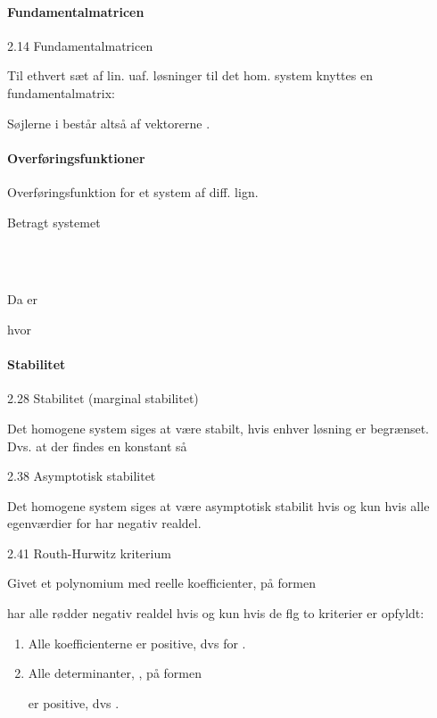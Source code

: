 \documentclass[
]{article}
\providecommand{\tightlist}{%
  \setlength{\itemsep}{0pt}\setlength{\parskip}{0pt}}
\begin{document}
\paragraph{Fundamentalmatricen}\label{fundamentalmatricen}

2.14 Fundamentalmatricen

Til ethvert sæt af {} lin. uaf. løsninger {} til det hom. system {}
knyttes en {} fundamentalmatrix:

Søjlerne i {} består altså af vektorerne {}.

\paragraph{Overføringsfunktioner}\label{overfuxf8ringsfunktioner}

Overføringsfunktion for et system af diff. lign.

Betragt systemet\\
{}\strut \\
{}\strut \\
Da er

hvor

\paragraph{Stabilitet}\label{stabilitet}

2.28 {} Stabilitet (marginal stabilitet)

Det homogene system {} siges at være stabilt, hvis enhver løsning {} er
begrænset.\\
Dvs. at der findes en konstant {} så {}

2.38 Asymptotisk stabilitet

Det homogene system {} siges at være asymptotisk stabilit hvis og kun
hvis alle egenværdier for {} har negativ realdel.

2.41 Routh-Hurwitz kriterium

Givet et polynomium med reelle koefficienter, på formen

har alle rødder negativ realdel hvis og kun hvis de flg to kriterier er
opfyldt:

\begin{enumerate}
\tightlist
\item
  Alle koefficienterne er positive, dvs {} for {}.
\item
  Alle {} determinanter, {}, på formen

  er positive, dvs {}.
\end{enumerate}
\end{document}
